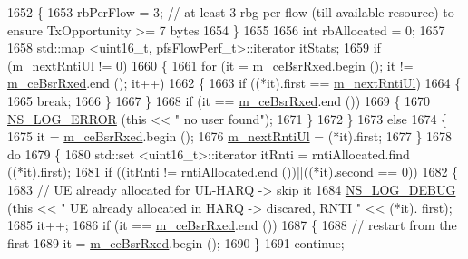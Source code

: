 \begin{DoxyCode}
1652     \{
1653       rbPerFlow = 3;  \textcolor{comment}{// at least 3 rbg per flow (till available resource) to ensure TxOpportunity >= 7
       bytes}
1654     \}
1655 
1656   \textcolor{keywordtype}{int} rbAllocated = 0;
1657 
1658   std::map <uint16\_t, pfsFlowPerf\_t>::iterator itStats;
1659   \textcolor{keywordflow}{if} (\hyperlink{classns3_1_1PfFfMacScheduler_ad4bed67ae396b364734c2cc0acc7e2ec}{m\_nextRntiUl} != 0)
1660     \{
1661       \textcolor{keywordflow}{for} (it = \hyperlink{classns3_1_1PfFfMacScheduler_a9d4cd2380a8e04f1e7d69ac67628b9cc}{m\_ceBsrRxed}.begin (); it != \hyperlink{classns3_1_1PfFfMacScheduler_a9d4cd2380a8e04f1e7d69ac67628b9cc}{m\_ceBsrRxed}.end (); it++)
1662         \{
1663           \textcolor{keywordflow}{if} ((*it).first == \hyperlink{classns3_1_1PfFfMacScheduler_ad4bed67ae396b364734c2cc0acc7e2ec}{m\_nextRntiUl})
1664             \{
1665               \textcolor{keywordflow}{break};
1666             \}
1667         \}
1668       \textcolor{keywordflow}{if} (it == \hyperlink{classns3_1_1PfFfMacScheduler_a9d4cd2380a8e04f1e7d69ac67628b9cc}{m\_ceBsrRxed}.end ())
1669         \{
1670           \hyperlink{group__logging_ga0261a8db1d4ac5f79417d117634fd455}{NS\_LOG\_ERROR} (\textcolor{keyword}{this} << \textcolor{stringliteral}{" no user found"});
1671         \}
1672     \}
1673   \textcolor{keywordflow}{else}
1674     \{
1675       it = \hyperlink{classns3_1_1PfFfMacScheduler_a9d4cd2380a8e04f1e7d69ac67628b9cc}{m\_ceBsrRxed}.begin ();
1676       \hyperlink{classns3_1_1PfFfMacScheduler_ad4bed67ae396b364734c2cc0acc7e2ec}{m\_nextRntiUl} = (*it).first;
1677     \}
1678   \textcolor{keywordflow}{do}
1679     \{
1680       std::set <uint16\_t>::iterator itRnti = rntiAllocated.find ((*it).first);
1681       \textcolor{keywordflow}{if} ((itRnti != rntiAllocated.end ())||((*it).second == 0))
1682         \{
1683           \textcolor{comment}{// UE already allocated for UL-HARQ -> skip it}
1684           \hyperlink{group__logging_ga413f1886406d49f59a6a0a89b77b4d0a}{NS\_LOG\_DEBUG} (\textcolor{keyword}{this} << \textcolor{stringliteral}{" UE already allocated in HARQ -> discared, RNTI "} << (*it).
      first);
1685           it++;
1686           \textcolor{keywordflow}{if} (it == \hyperlink{classns3_1_1PfFfMacScheduler_a9d4cd2380a8e04f1e7d69ac67628b9cc}{m\_ceBsrRxed}.end ())
1687             \{
1688               \textcolor{comment}{// restart from the first}
1689               it = \hyperlink{classns3_1_1PfFfMacScheduler_a9d4cd2380a8e04f1e7d69ac67628b9cc}{m\_ceBsrRxed}.begin ();
1690             \}
1691           \textcolor{keywordflow}{continue};

\end{DoxyCode}
